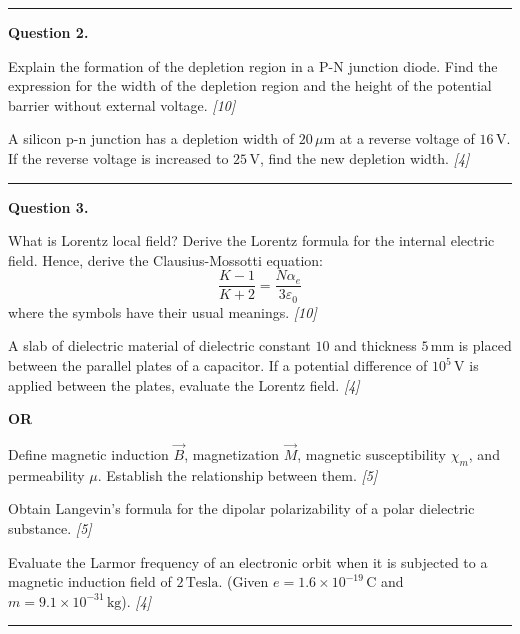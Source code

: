 \documentclass[11pt,a4paper]{article}
\newcommand{\pts}[1]{\hfill   \textit{[#1]}}
\begin{document}
\medskip\rule{\linewidth}{0.2pt}




\noindent   \textbf{Question 2.}

\begin{parts}
  \item Explain the formation of the depletion region in a P-N junction diode. Find the expression for the width of the depletion region and the height of the potential barrier without external voltage. \pts{10}
  \item A silicon p-n junction has a depletion width of $20\,\mu \text{m}$ at a reverse voltage of $16\, \text{V}$. If the reverse voltage is increased to $25\, \text{V}$, find the new depletion width. \pts{4}
\end{parts}

\medskip\rule{\linewidth}{0.2pt}




\noindent   \textbf{Question 3.}

\begin{parts}
  \item What is Lorentz local field? Derive the Lorentz formula for the internal electric field. Hence, derive the Clausius-Mossotti equation:
    \[ \frac{K - 1}{K + 2} = \frac{N \alpha_e}{3 \varepsilon_0} \]
    where the symbols have their usual meanings. \pts{10}
  \item A slab of dielectric material of dielectric constant $10$ and thickness $5\, \text{mm}$ is placed between the parallel plates of a capacitor. If a potential difference of $10^5\, \text{V}$ is applied between the plates, evaluate the Lorentz field. \pts{4}
\end{parts}
\hfill   \textbf{OR}

\begin{parts}
  \item Define magnetic induction $\vec{B}$, magnetization $\vec{M}$, magnetic susceptibility $\chi_m$, and permeability $\mu$. Establish the relationship between them. \pts{5}
  \item Obtain Langevin's formula for the dipolar polarizability of a polar dielectric substance. \pts{5}
  \item Evaluate the Larmor frequency of an electronic orbit when it is subjected to a magnetic induction field of $2\, \text{Tesla}$. (Given $e = 1.6  \times 10^{-19}\, \text{C}$ and $m = 9.1  \times 10^{-31}\, \text{kg}$). \pts{4}
\end{parts}

\medskip\rule{\linewidth}{0.2pt}
\end{document}
